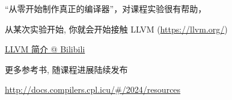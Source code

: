 \begin{frame}{}
  \begin{center}
    ``从零开始制作真正的编译器''，对课程实验很有帮助，
  \end{center}
\end{frame}

\begin{frame}{}

  \begin{center}
    从某次实验开始, 你就会开始接触 LLVM (\url{https://llvm.org/})
  \end{center}
\end{frame}

\begin{frame}{}

  \vspace{0.20cm}
  \begin{center}
    \href{https://www.bilibili.com/video/BV1RF411K7F5/?vd_source=e3cbbf5ca80db268fa006d63626e267e}{LLVM 简介 @ Bilibili}
  \end{center}
\end{frame}

\begin{frame}{}
  \begin{center}
    更多参考书, 随课程进展陆续发布


    \pause
    \vspace{0.30cm}
    \url{http://docs.compilers.cpl.icu/\#/2024/resources}
  \end{center}
\end{frame}
